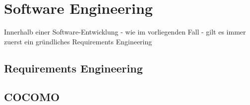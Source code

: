 \section{Software Engineering}{
Innerhalb einer Software-Entwicklung - wie im vorliegenden Fall - gilt es immer zuerst ein gründliches Requirements Engineering 

	\subsection{Requirements Engineering}
	
	
	\subsection{COCOMO}
	
}